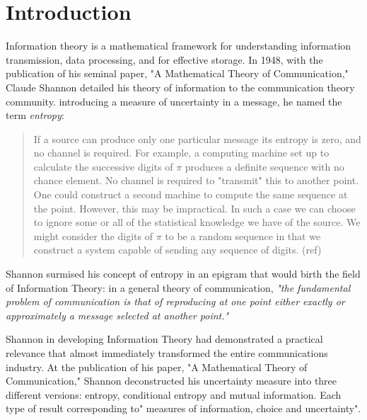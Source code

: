 \documentclass[12pt]{article}
\begin{document}
	
	
	\section{Introduction}
	
	Information theory is a mathematical framework for understanding information transmission, data processing, and for effective storage. In 1948, with the publication of his seminal paper, "A Mathematical Theory of Communication," Claude Shannon detailed his theory of information to the communication theory community. introducing a measure of uncertainty in a message, he named the term \emph{entropy}:
	
	\begin{quote}
	{If a source can produce only one particular message its entropy is zero, and no channel is required. For example, a computing machine set up to calculate the successive digits of \(\pi\) produces a definite sequence with no chance element. No channel is required to "transmit" this to another point. One could construct a second machine to compute the same sequence at the point. However, this may be impractical. In such a case we can choose to ignore some or all of the statistical knowledge we have of the source. We might consider the digits of \(\pi\) to be a random sequence in that we construct a system capable of sending any sequence of digits.} (ref)
	\end{quote}
	
	Shannon surmised his concept of entropy in an epigram that would birth the field of Information Theory: in a general theory of communication, \emph{"the fundamental problem of communication is that of reproducing at one point either exactly or approximately a message selected at another point."}
	
	 Shannon in developing Information Theory had demonstrated a practical relevance that  almost immediately transformed the entire communications industry. At the publication of his paper, "A Mathematical Theory of Communication," Shannon deconstructed his uncertainty measure into three different versions: entropy, conditional entropy and mutual information. Each type of result corresponding to" measures of information, choice and uncertainty".
\end{document}
